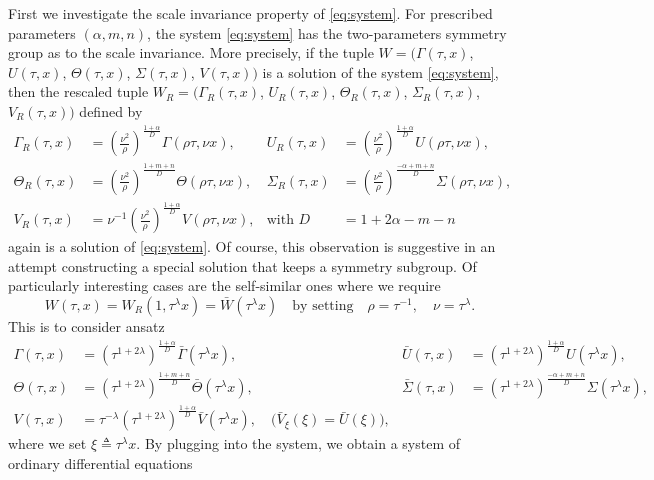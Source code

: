 \documentclass[a4paper,11pt]{article}
\def\bG{{\bar{\Gamma}}}
\def\bV{{\bar{V}}}
\def\bTh{{\bar{\Theta}}}
\def\bS{{\bar{\Sigma}}}
\def\bU{{\bar{U}}}
\theoremstyle{remark}
\begin{document}
First we investigate the scale invariance property of \eqref{eq:system}. For prescribed parameters $( \alpha, m,n)$, the system \eqref{eq:system} has the two-parameters symmetry group as to the scale invariance. More precisely, if the tuple $W=\big( \Gamma(\tau,x)$, $U(\tau,x)$, $\Theta(\tau,x)$, $\Sigma(\tau,x)$, $V(\tau,x)\big)$ is a solution of the system \eqref{eq:system}, then the rescaled tuple $W _R=\big( \Gamma _R(\tau,x)$, $U _R(\tau,x)$, $\Theta _R(\tau,x)$, $\Sigma _R(\tau,x)$, $V _R(\tau,x)\big)$ defined by
\begin{align*}
 \Gamma _R(\tau,x) &= \left(\frac{\nu^2}{\rho}\right) ^{ \frac{1+ \alpha}{D}} \Gamma( \rho \tau, \nu x), & U _R(\tau,x) &=\left(\frac{\nu^2}{\rho}\right) ^{ \frac{1+ \alpha}{D}} U( \rho \tau, \nu x),\\
 \Theta _R(\tau,x) &= \left(\frac{\nu^2}{\rho}\right) ^{ \frac{1+ m +n}{D}} \Theta( \rho \tau, \nu x), & \Sigma _R(\tau,x) &= \left(\frac{\nu^2}{\rho}\right) ^{ \frac{- \alpha +m+n}{D}} \Sigma( \rho \tau, \nu x),\\
 V _R(\tau,x) &= \nu ^{-1} \left(\frac{\nu^2}{\rho}\right) ^{ \frac{1+ \alpha}{D}} V( \rho \tau, \nu x), & \text{with } D&=1+ 2\alpha -m-n
\end{align*}
again is a solution of \eqref{eq:system}. Of course, this observation is suggestive in an attempt constructing a special solution that keeps a symmetry subgroup. Of particularly interesting cases are the self-similar ones where we require
$$ W(\tau,x) = W _R(1,\tau ^\lambda x)= \bar{W}(\tau ^\lambda x) \quad \text{by setting} \quad \rho = \tau ^{-1}, \quad \nu=\tau^ \lambda.$$
This is to consider ansatz
\begin{align*}
 \Gamma (\tau,x) &= \left(\tau^{1+ 2 \lambda}\right) ^{ \frac{1+ \alpha}{D}} \bG(\tau ^\lambda x), & \bU (\tau,x) &=\left(\tau^{1+ 2 \lambda}\right) ^{ \frac{1+ \alpha}{D}} U( \tau ^\lambda x),\\
 \Theta (\tau,x) &= \left(\tau^{1+ 2 \lambda}\right) ^{ \frac{1+ m +n}{D}} \bTh( \tau ^\lambda x), & \bS (\tau,x) &= \left(\tau^{1+ 2 \lambda}\right) ^{ \frac{- \alpha +m+n}{D}} \Sigma( \tau ^\lambda x),\\
 V (\tau,x) &= \tau ^{-\lambda} \left(\tau^{1+ 2 \lambda}\right) ^{ \frac{1+ \alpha}{D}} \bV( \tau ^\lambda x), \quad \big(\bV _\xi(\xi) = \bU(\xi)\big),
\end{align*}
where we set $\xi\triangleq\tau ^\lambda x$. By plugging into the system, we obtain a system of ordinary differential equations
\end{document}
